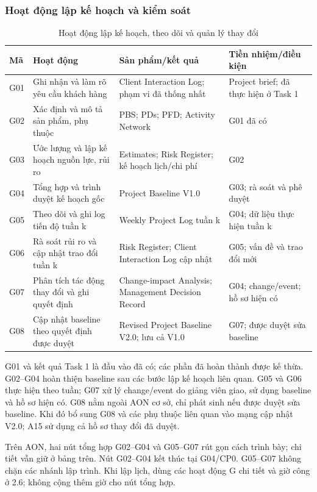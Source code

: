 \documentclass{article}
\begin{document}
\begin{landscape}
\subsubsection{Hoạt động lập kế hoạch và kiểm soát}
\begin{table}[H]
\centering
\caption{Hoạt động lập kế hoạch, theo dõi và quản lý thay đổi}
\small
\renewcommand{\arraystretch}{1.25}
\begin{tabularx}{\linewidth}{|p{1.2cm}|X|p{8cm}|p{4.2cm}|}
\hline
\textbf{Mã} & \textbf{Hoạt động} & \textbf{Sản phẩm/kết quả} & \textbf{Tiền nhiệm/điều kiện} \\ \hline
G01 & Ghi nhận và làm rõ yêu cầu khách hàng & Client Interaction Log; phạm vi đã thống nhất & Project brief; đã thực hiện ở Task 1 \\ \hline
G02 & Xác định và mô tả sản phẩm, phụ thuộc & PBS; PDs; PFD; Activity Network & G01 đã có \\ \hline
G03 & Ước lượng và lập kế hoạch nguồn lực, rủi ro & Estimates; Risk Register; kế hoạch lịch/chi phí & G02 \\ \hline
G04 & Tổng hợp và trình duyệt kế hoạch gốc & Project Baseline V1.0 & G03; rà soát và phê duyệt \\ \hline
G05 & Theo dõi và ghi log tiến độ tuần k & Weekly Project Log tuần k & G04; dữ liệu thực hiện tuần k \\ \hline
G06 & Rà soát rủi ro và cập nhật trao đổi tuần k & Risk Register; Client Interaction Log cập nhật & G05; vấn đề và trao đổi mới \\ \hline
G07 & Phân tích tác động thay đổi và ghi quyết định & Change-impact Analysis; Management Decision Record & G04; change/event; hồ sơ hiện có \\ \hline
G08 & Cập nhật baseline theo quyết định được duyệt & Revised Project Baseline V2.0; lưu cả V1.0 & G07; được duyệt sửa baseline \\ \hline
\end{tabularx}
\end{table}

G01 và kết quả Task 1 là đầu vào đã có; các phần đã hoàn thành được kế thừa. G02--G04 hoàn thiện baseline sau các bước lập kế hoạch liên quan. G05 và G06 thực hiện theo tuần; G07 xử lý change/event do giảng viên giao, sử dụng baseline và hồ sơ hiện có. G08 nằm ngoài AON cơ sở, chỉ phát sinh nếu được duyệt sửa baseline. Khi đó bổ sung G08 và các phụ thuộc liên quan vào mạng cập nhật V2.0; A15 sử dụng cả hồ sơ thay đổi đã duyệt.

\noindent Trên AON, hai nút tổng hợp G02--G04 và G05--G07 rút gọn cách trình bày; chi tiết vẫn giữ ở bảng trên. Nút G02--G04 kết thúc tại G04/CP0. G05--G07 không chặn các nhánh lập trình. Khi lập lịch, dùng các hoạt động G chi tiết và giờ công ở 2.6; không cộng thêm giờ cho nút tổng hợp.


\end{landscape}
\end{document}
